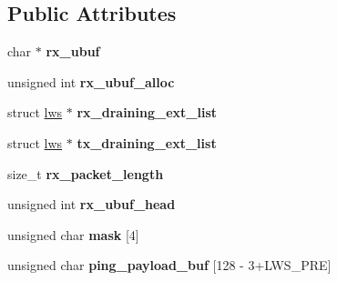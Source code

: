 \subsection*{Public Attributes}
\begin{DoxyCompactItemize}
\item 
\mbox{\label{struct__lws__websocket__related_ad722eb11e3b8686f08f43694e3a3b430}} 
char $\ast$ {\bfseries rx\+\_\+ubuf}
\item 
\mbox{\label{struct__lws__websocket__related_a72bf5ca922967c723add1a761db2f285}} 
unsigned int {\bfseries rx\+\_\+ubuf\+\_\+alloc}
\item 
\mbox{\label{struct__lws__websocket__related_af2633ae20f75f891482e332a7bac6e7c}} 
struct \hyperlink{structlws}{lws} $\ast$ {\bfseries rx\+\_\+draining\+\_\+ext\+\_\+list}
\item 
\mbox{\label{struct__lws__websocket__related_ac4a9d37042b6c5679e1b4a371c75c842}} 
struct \hyperlink{structlws}{lws} $\ast$ {\bfseries tx\+\_\+draining\+\_\+ext\+\_\+list}
\item 
\mbox{\label{struct__lws__websocket__related_aed512f884c4cceff94702b927656afd9}} 
size\+\_\+t {\bfseries rx\+\_\+packet\+\_\+length}
\item 
\mbox{\label{struct__lws__websocket__related_abb66bf82a822c857945654fa25af56b1}} 
unsigned int {\bfseries rx\+\_\+ubuf\+\_\+head}
\item 
\mbox{\label{struct__lws__websocket__related_ae9421cf8406abc5a7dd066edc070ad9d}} 
unsigned char {\bfseries mask} \mbox{[}4\mbox{]}
\item 
\mbox{\label{struct__lws__websocket__related_a145d59c658423fa72696ec7e1ead9c9d}} 
unsigned char {\bfseries ping\+\_\+payload\+\_\+buf} \mbox{[}128 -\/ 3+L\+W\+S\+\_\+\+P\+RE\mbox{]}
\item 
\mbox{\label{struct__lws__websocket__related_a38cad38279414c9e4c9e93e0843b4974}} 

\end{DoxyCompactItemize}
